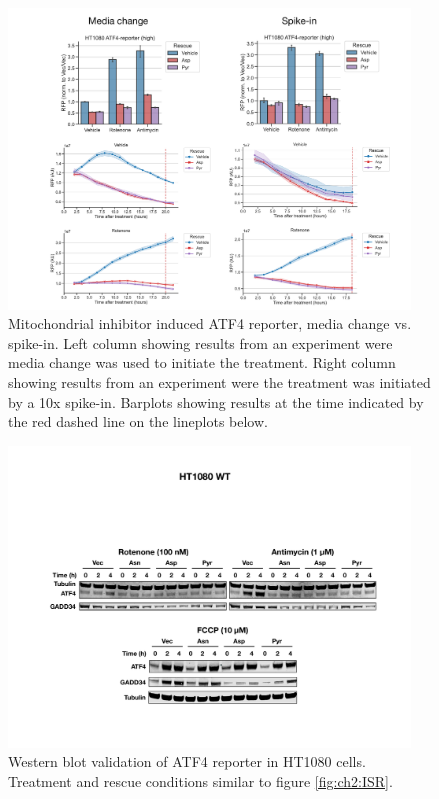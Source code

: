 \begin{figure}
    \centering
    \includegraphics[width=0.95\textwidth]{figures/chap2/app/atf4_chVSsp.pdf}
    \caption[ATF4 reporter, media change vs. spike-in]{
    Mitochondrial inhibitor induced ATF4 reporter, media change vs. spike-in.
    Left column showing results from an experiment were media change was used to initiate the treatment.
    Right column showing results from an experiment were the treatment was initiated by a 10x spike-in.
    Barplots showing results at the time indicated by the red dashed line on the lineplots below.
    }
    \label{fig:app_ch2:sal_frac_conc}
\end{figure}


\begin{figure}
    \centering
    \includegraphics[width=0.95\textwidth]{figures/chap2/app/HT1080_ISR_western.pdf}
    \caption[Mito inhibitor, ATF4 western]{
    Western blot validation of ATF4 reporter in HT1080 cells.
    Treatment and rescue conditions similar to figure \ref{fig:ch2:ISR}.
    }
    \label{fig:app_ch2:HT1080_ISR_western}
\end{figure}



